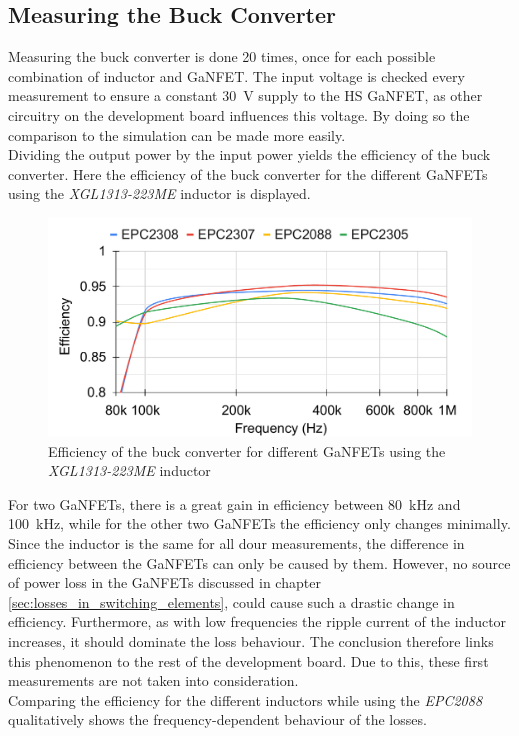 \subsection{Measuring the Buck Converter}\label{sec:measuring_the_buck_converter}
Measuring the buck converter is done 20 times, once for each possible combination of inductor and \ac{GaNFET}. The input voltage is checked every measurement to ensure a constant \SI{30}{V} supply to the \ac{HS} \ac{GaNFET}, as other circuitry on the development board influences this voltage. By doing so the comparison to the simulation can be made more easily.\\
Dividing the output power by the input power yields the efficiency of the buck converter. Here the efficiency of the buck converter for the different \acp{GaNFET} using the \textit{XGL1313-223ME} inductor is displayed.
\begin{figure}[H]
    \centering
    \includegraphics[width=0.75\linewidth]{Bilder//Kapitel4/BC_Meas_Efficiency_GaN_XGL103.pdf}
    \caption{Efficiency of the buck converter for different \acp{GaNFET} using the \textit{XGL1313-223ME} inductor}
    \label{fig:efficiency_bc_GaNFETs}
\end{figure}
For two \acp{GaNFET}, there is a great gain in efficiency between \SI{80}{\kilo\Hz} and \SI{100}{\kilo\Hz}, while for the other two \acp{GaNFET} the efficiency only changes minimally. Since the inductor is the same for all dour measurements, the difference in efficiency between the \acp{GaNFET} can only be caused by them. However, no source of power loss in the \acp{GaNFET} discussed in chapter \ref{sec:losses_in_switching_elements}, could cause such a drastic change in efficiency. Furthermore, as with low frequencies the ripple current of the inductor increases, it should dominate the loss behaviour. The conclusion therefore links this phenomenon to the rest of the development board. Due to this, these first measurements are not taken into consideration.\\
Comparing the efficiency for the different inductors while using the \textit{EPC2088} qualitatively shows the frequency-dependent behaviour of the losses. 
